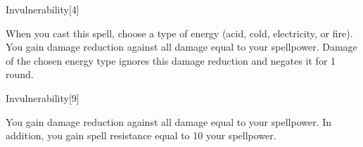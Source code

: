 \begin{spellsection}[Lesser]{Invulnerability}[4]
    \begin{spellheader}
    \end{spellheader}
    \begin{spellcontent}
        \begin{spelltargetinginfo}
        \end{spelltargetinginfo}
        \begin{spelleffects}
            \spellspecial When you cast this spell, choose a type of energy (acid, cold, electricity, or fire).
            \spelleffect You gain damage reduction against all damage equal to your spellpower.
            Damage of the chosen energy type ignores this damage reduction and negates it for 1 round.
            \spelldur \durlong
        \end{spelleffects}
    \end{spellcontent}
    \begin{spellfooter}
        \miscastexplode
    \end{spellfooter}
\end{spellsection}

\begin{spellsection}{Invulnerability}[9]
    \begin{spellheader}
    \end{spellheader}
    \begin{spellcontent}
        \begin{spelltargetinginfo}
        \end{spelltargetinginfo}
        \begin{spelleffects}
            \spelleffect You gain damage reduction against all damage equal to your spellpower.
            In addition, you gain spell resistance equal to 10 \add your spellpower.
            \spelldur \durlong
        \end{spelleffects}
    \end{spellcontent}
    \begin{spellfooter}
        \miscastexplode
    \end{spellfooter}
\end{spellsection}

